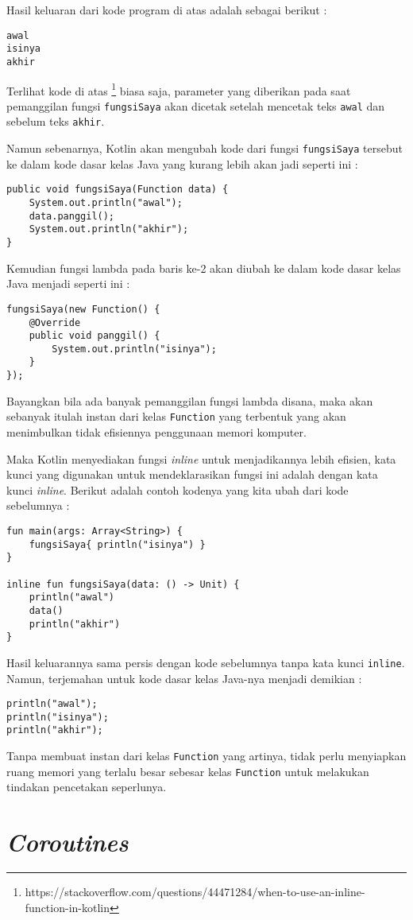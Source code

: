 Hasil keluaran dari kode program di atas adalah sebagai berikut :

\begin{lstlisting}
awal
isinya
akhir
\end{lstlisting}

Terlihat kode di atas \footnote{https://stackoverflow.com/questions/44471284/when-to-use-an-inline-function-in-kotlin} biasa saja, parameter yang diberikan pada saat pemanggilan fungsi \texttt{fungsiSaya} akan dicetak setelah mencetak teks \texttt{awal} dan sebelum teks \texttt{akhir}.

Namun sebenarnya, Kotlin akan mengubah kode dari fungsi \texttt{fungsiSaya} tersebut ke dalam kode dasar kelas Java yang kurang lebih akan jadi seperti ini :

\begin{lstlisting}
public void fungsiSaya(Function data) {
	System.out.println("awal");
	data.panggil();
	System.out.println("akhir");
}
\end{lstlisting}

Kemudian fungsi lambda pada baris ke-2 akan diubah ke dalam kode dasar kelas Java menjadi seperti ini :

\begin{lstlisting}
fungsiSaya(new Function() {
	@Override
	public void panggil() {
		System.out.println("isinya");
	}
});
\end{lstlisting}

Bayangkan bila ada banyak pemanggilan fungsi lambda disana, maka akan sebanyak itulah instan dari kelas \texttt{Function} yang terbentuk yang akan menimbulkan tidak efisiennya penggunaan memori komputer.

Maka Kotlin menyediakan fungsi \textit{inline} untuk menjadikannya lebih efisien, kata kunci yang digunakan untuk mendeklarasikan fungsi ini adalah dengan kata kunci 
\textit{inline}. Berikut adalah contoh kodenya yang kita ubah dari kode sebelumnya :

\begin{lstlisting}
fun main(args: Array<String>) {
	fungsiSaya{ println("isinya") }
}

inline fun fungsiSaya(data: () -> Unit) {
	println("awal")
	data()
	println("akhir")
}
\end{lstlisting}

Hasil keluarannya sama persis dengan kode sebelumnya tanpa kata kunci \texttt{inline}. Namun, terjemahan untuk kode dasar kelas Java-nya menjadi demikian :

\begin{lstlisting}
println("awal");
println("isinya");
println("akhir");
\end{lstlisting}

Tanpa membuat instan dari kelas \texttt{Function} yang artinya, tidak perlu menyiapkan ruang memori yang terlalu besar sebesar kelas \texttt{Function} untuk melakukan tindakan pencetakan seperlunya.

\section{\textit{Coroutines}}